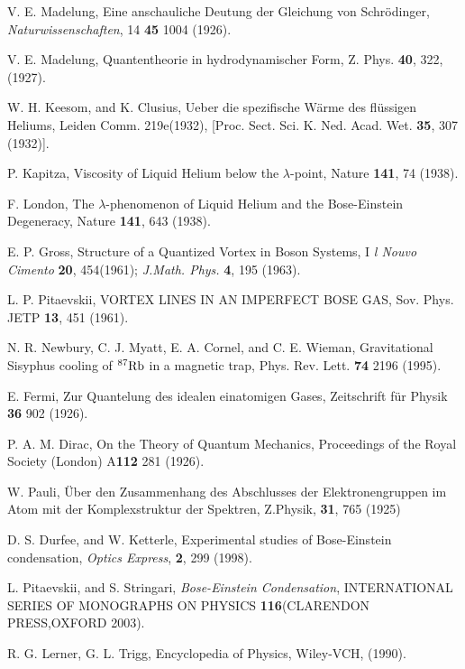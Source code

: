 \documentclass[12pt,a4paper]{jbook}
\begin{document}
\begin{thebibliography}{99}
        V. E. Madelung,
        Eine anschauliche Deutung der Gleichung von Schr\"odinger,
		{\it Naturwissenschaften}, 14 {\bf 45} 1004 (1926).

        V. E. Madelung,
        Quantentheorie in hydrodynamischer Form,
        Z. Phys. {\bf 40}, 322, (1927).

		W. H. Keesom, and K. Clusius,
		Ueber die spezifische W\"{a}rme des fl\"{u}ssigen Heliums,
		Leiden Comm. 219e(1932),
		[Proc. Sect. Sci. K. Ned. Acad. Wet. {\bf 35}, 307 (1932)].

		P. Kapitza,
		Viscosity of Liquid Helium below the $\lambda$-point,
		Nature {\bf 141}, 74 (1938).

		F. London,
		The $\lambda$-phenomenon of Liquid Helium and the Bose-Einstein Degeneracy,
		Nature {\bf 141}, 643 (1938).

		E. P. Gross,
		Structure of a Quantized Vortex in Boson Systems,
		I {\em l Nouvo Cimento} {\bf 20}, 454(1961); {\em J.Math. Phys.} {\bf 4}, 195 (1963).

		L. P. Pitaevskii,
		VORTEX LINES IN AN IMPERFECT BOSE GAS,
		Sov. Phys. JETP {\bf 13}, 451 (1961).

		N. R. Newbury, C. J. Myatt, E. A. Cornel, and C. E. Wieman,
		Gravitational Sisyphus cooling of $^{87}{\rm Rb}$ in a magnetic trap,
		Phys. Rev. Lett. {\bf 74} 2196 (1995).

		E. Fermi,
		Zur Quantelung des idealen einatomigen Gases,
		Zeitschrift f\"{u}r Physik {\bf 36} 902 (1926).

		P. A. M. Dirac,
		On the Theory of Quantum Mechanics, 
		Proceedings of the Royal Society (London) A{\bf 112} 281 (1926).

		W. Pauli,
		\"{U}ber den Zusammenhang des Abschlusses der Elektronengruppen im Atom mit der Komplexstruktur der Spektren,
		Z.Physik, {\bf 31}, 765 (1925)

		D. S. Durfee, and W. Ketterle,
		Experimental studies of Bose-Einstein condensation,
		{\it Optics Express}, {\bf 2}, 299 (1998).
	
		L. Pitaevskii, and S. Stringari,
		{\it Bose-Einstein Condensation}, INTERNATIONAL SERIES OF MONOGRAPHS ON PHYSICS
		{\bf 116}(CLARENDON PRESS,OXFORD 2003).

		R. G. Lerner, G. L. Trigg,
		Encyclopedia of Physics,
		Wiley-VCH, (1990).


\end{thebibliography}
\end{document}
